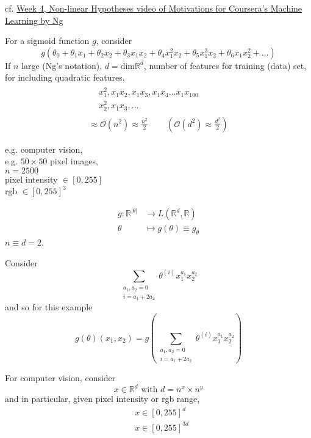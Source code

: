 \documentclass[10pt]{amsart}
\begin{document}
\begin{multicols*}{2}
cf. \href{https://www.coursera.org/learn/machine-learning/lecture/OAOhO/non-linear-hypotheses}{Week 4, Non-linear Hypotheses video of Motivations for Coursera's Machine Learning by Ng}

For a sigmoid function $g$, consider
\[
g(\theta_0 + \theta_1 x_1 + \theta_2 x_2 + \theta_3 x_1 x_2 + \theta_4 x_1^2 x_2 + \theta_5 x_1^3 x_2 + \theta_6 x_1 x_2^2 + \dots ) 
\]
If $n$ large (Ng's notation), $d=\text{dim}\mathbb{R}^d$, number of features for training (data) set, \\
for including quadratic features,
\[
\begin{gathered}
\begin{aligned}
  & x_1^2, x_1x_2, x_1 x_3 , x_1 x_4 \dots x_1 x_{100} \\ 
  & x_2^2 , x_1x_3, \dots 
  \end{aligned} \\
\approx \mathcal{O}(n^2) \approx \frac{n^2}{2}  \qquad \, (\mathcal{O}(d^2) \approx \frac{d^2}{2} )
\end{gathered}
\]

e.g. computer vision, \\
e.g. $50 \times 50 $ pixel images, \\
$n=2500$ \\
 pixel intensity $\in [0,255] $ \\ 
 rgb $ \in [0,255]^3$

 \[
\begin{aligned}
  g:\mathbb{R}^{ |\theta| } & \to L(\mathbb{R}^d,\mathbb{R}) \\ 
 \theta & \mapsto g(\theta) \equiv g_{\theta}
\end{aligned}
\]
$n \equiv d=2$.

Consider
\[
\sum_{ \substack{ a_1,a_2 =0 \\ i=a_1 + 2a_2 } } \theta^{(i)}x_1^{a_1} x_2^{a_2} 
\]
and so for this example
\[
g(\theta)(x_1,x_2) = g\left( \sum_{ \substack{ a_1,a_2=0 \\ i=a_1+2a_2 } } \theta^{(i)}x_1^{a_1} x_2^{a_2} \right)
\]

For computer vision, consider
\[
x\in \mathbb{R}^d \text{ with } d = n^x \times n^y 
\]
and in particular, given pixel intensity or rgb range,
\[
\begin{aligned}
  & x\in [0,255]^d \\ 
  & x\in [0,255]^{3d}
\end{aligned}
\]

 




\end{multicols*}
\end{document}
